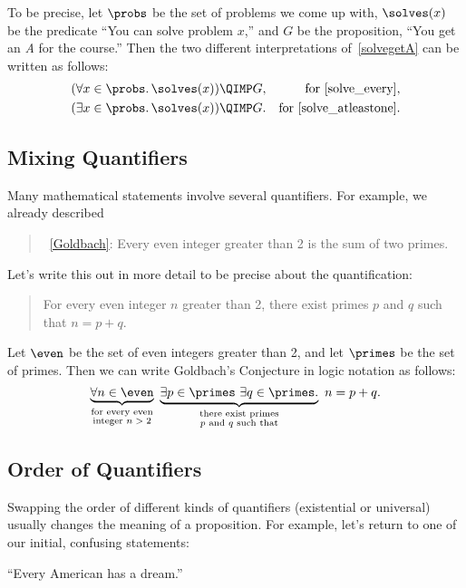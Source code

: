 \iffalse
In any case, notice that this quantified phrase appears inside a
larger if-then statement.  This is quite normal; quantified statements
are themselves propositions and can be combined
with \QAND, \QOR, \QIMPLIES, etc., just like any other proposition.
\fi
To be precise, let $\probs$ be the set of problems we come up with,
$\solves(x)$ be the predicate ``You can solve problem $x$,'' and $G$
be the proposition, ``You get an \emph{A} for the course.''  Then the
two different interpretations of~\eqref{solvegetA}
can be written as follows:
\begin{align*}
(\forall x \in \probs.\, & \solves(x)) \QIMP G,
     & \text{for~\eqref{solve_every}},\\
(\exists x \in \probs.\, & \solves(x)) \QIMP G.
     & \text{for~\eqref{solve_atleastone}}.
\end{align*}

\subsection{Mixing Quantifiers}

Many mathematical statements involve several quantifiers.  For
example, we already described
\begin{quote}
 ~\ref{Goldbach}: Every even integer
 greater than 2 is the sum of two primes.
\end{quote}
Let's write this out in more detail to be precise about the
quantification:
\begin{quote}
For every even integer $n$ greater than 2,
there exist primes $p$ and $q$ such that $n = p + q$.
\end{quote}
Let $\even$ be the set of even integers greater than 2, and let $\primes$ be the
set of primes.  Then we can write Goldbach's Conjecture in logic
notation as follows:
\[
\underbrace{\forall n \in \even}_{\substack
    {\text{for every even} \\
     \text{integer $n > 2$}}}\
\underbrace{\exists p \in \primes\ \exists q \in \primes.}_{\substack
    {\text{there exist primes} \\
     \text{$p$ and $q$ such that}}}
\ n = p + q.
\]

\subsection{Order of Quantifiers}

Swapping the order of different kinds of quantifiers (existential or
universal) usually changes the meaning of a proposition.  For example,
let's return to one of our initial, confusing statements:
\begin{center}
``Every American has a dream.''
\end{center}

